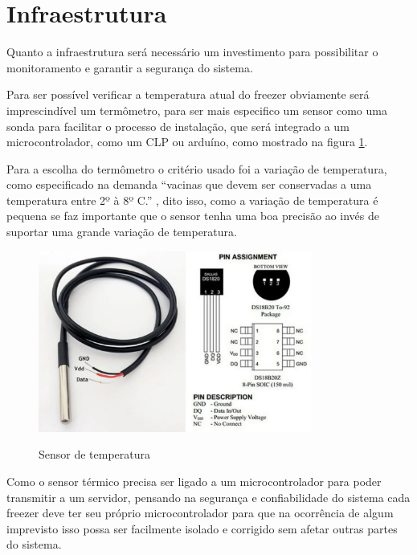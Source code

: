 \section{Infraestrutura}

    Quanto a infraestrutura será necessário um 
    investimento para possibilitar o monitoramento
    e garantir a segurança do sistema.

    Para ser possível verificar a temperatura atual do 
    freezer obviamente será imprescindível um termômetro,
    para ser mais especifico um sensor como uma sonda para facilitar
    o processo de instalação, que será integrado
    a um microcontrolador, como um CLP ou arduíno, 
    como mostrado na figura \ref{fig:termometro}.

    Para a escolha do termômetro o critério usado foi 
    a variação de temperatura, como especificado na demanda
    ``vacinas que devem ser conservadas a uma temperatura entre 2º à 8º C.''
    ,
    dito isso, como a variação de temperatura é pequena se faz 
    importante que o sensor tenha uma boa precisão ao 
    invés de suportar uma grande variação de temperatura.

    \begin{figure}[h]
        \caption{Sensor de temperatura}
        \centering
        \includegraphics[width=0.8\textwidth]{img/termometro_esquema.png}
        \label{fig:termometro}
    \end{figure}


    Como o sensor térmico precisa ser ligado a um microcontrolador
    para poder transmitir a um servidor, pensando na segurança e 
    confiabilidade do sistema cada freezer deve ter seu próprio 
    microcontrolador para que na ocorrência de algum imprevisto
    isso possa ser facilmente isolado e corrigido sem afetar 
    outras partes do sistema.

